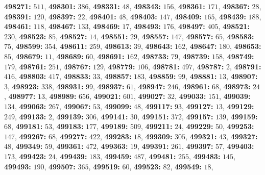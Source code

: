 \textsf{\bfseries 498271:} $511$, \textsf{\bfseries 498301:} $386$, \textsf{\bfseries 498331:} $48$, \textsf{\bfseries 498343:} $156$, \textsf{\bfseries 498361:} $171$, \textsf{\bfseries 498367:} $28$, \textsf{\bfseries 498391:} $120$, \textsf{\bfseries 498397:} $22$, \textsf{\bfseries 498401:} $48$, \textsf{\bfseries 498403:} $147$, \textsf{\bfseries 498409:} $165$, \textsf{\bfseries 498439:} $188$, \textsf{\bfseries 498461:} $118$, \textsf{\bfseries 498467:} $133$, \textsf{\bfseries 498469:} $17$, \textsf{\bfseries 498493:} $176$, \textsf{\bfseries 498497:} $405$, \textsf{\bfseries 498521:} $230$, \textsf{\bfseries 498523:} $85$, \textsf{\bfseries 498527:} $14$, \textsf{\bfseries 498551:} $29$, \textsf{\bfseries 498557:} $147$, \textsf{\bfseries 498577:} $65$, \textsf{\bfseries 498583:} $75$, \textsf{\bfseries 498599:} $354$, \textsf{\bfseries 498611:} $259$, \textsf{\bfseries 498613:} $39$, \textsf{\bfseries 498643:} $162$, \textsf{\bfseries 498647:} $180$, \textsf{\bfseries 498653:} $85$, \textsf{\bfseries 498679:} $11$, \textsf{\bfseries 498689:} $60$, \textsf{\bfseries 498691:} $162$, \textsf{\bfseries 498733:} $79$, \textsf{\bfseries 498739:} $158$, \textsf{\bfseries 498749:} $179$, \textsf{\bfseries 498761:} $251$, \textsf{\bfseries 498767:} $129$, \textsf{\bfseries 498779:} $106$, \textsf{\bfseries 498781:} $497$, \textsf{\bfseries 498787:} $2$, \textsf{\bfseries 498791:} $416$, \textsf{\bfseries 498803:} $417$, \textsf{\bfseries 498833:} $33$, \textsf{\bfseries 498857:} $183$, \textsf{\bfseries 498859:} $99$, \textsf{\bfseries 498881:} $13$, \textsf{\bfseries 498907:} $3$, \textsf{\bfseries 498923:} $338$, \textsf{\bfseries 498931:} $99$, \textsf{\bfseries 498937:} $61$, \textsf{\bfseries 498947:} $246$, \textsf{\bfseries 498961:} $68$, \textsf{\bfseries 498973:} $24$, \textsf{\bfseries 498977:} $13$, \textsf{\bfseries 498989:} $656$, \textsf{\bfseries 499021:} $601$, \textsf{\bfseries 499027:} $32$, \textsf{\bfseries 499033:} $151$, \textsf{\bfseries 499039:} $134$, \textsf{\bfseries 499063:} $267$, \textsf{\bfseries 499067:} $53$, \textsf{\bfseries 499099:} $48$, \textsf{\bfseries 499117:} $93$, \textsf{\bfseries 499127:} $13$, \textsf{\bfseries 499129:} $249$, \textsf{\bfseries 499133:} $2$, \textsf{\bfseries 499139:} $306$, \textsf{\bfseries 499141:} $30$, \textsf{\bfseries 499151:} $372$, \textsf{\bfseries 499157:} $139$, \textsf{\bfseries 499159:} $68$, \textsf{\bfseries 499181:} $53$, \textsf{\bfseries 499183:} $177$, \textsf{\bfseries 499189:} $509$, \textsf{\bfseries 499211:} $24$, \textsf{\bfseries 499229:} $50$, \textsf{\bfseries 499253:} $147$, \textsf{\bfseries 499267:} $68$, \textsf{\bfseries 499277:} $422$, \textsf{\bfseries 499283:} $18$, \textsf{\bfseries 499309:} $305$, \textsf{\bfseries 499321:} $43$, \textsf{\bfseries 499327:} $48$, \textsf{\bfseries 499349:} $59$, \textsf{\bfseries 499361:} $472$, \textsf{\bfseries 499363:} $19$, \textsf{\bfseries 499391:} $261$, \textsf{\bfseries 499397:} $57$, \textsf{\bfseries 499403:} $173$, \textsf{\bfseries 499423:} $24$, \textsf{\bfseries 499439:} $183$, \textsf{\bfseries 499459:} $487$, \textsf{\bfseries 499481:} $255$, \textsf{\bfseries 499483:} $145$, \textsf{\bfseries 499493:} $190$, \textsf{\bfseries 499507:} $365$, \textsf{\bfseries 499519:} $60$, \textsf{\bfseries 499523:} $82$, \textsf{\bfseries 499549:} $18$, 
